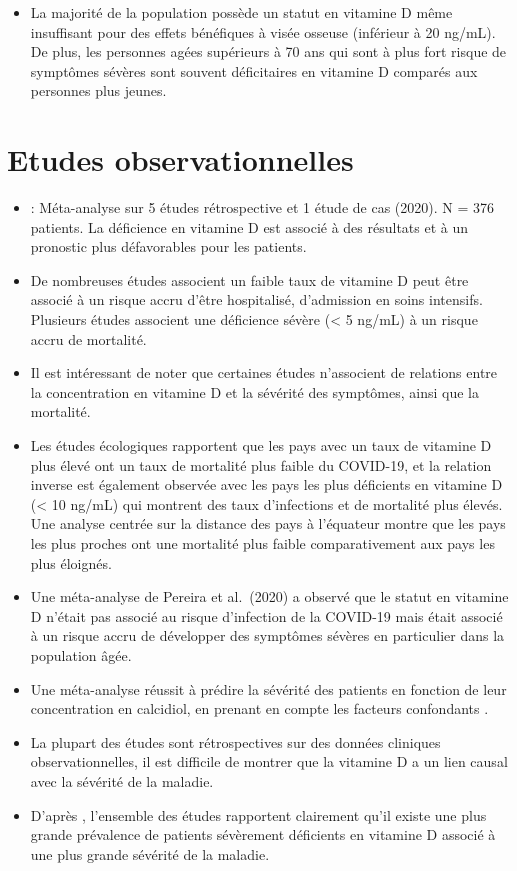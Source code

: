 \documentclass[
  a4paper,
  DIV=11,
  numbers=noendperiod,
  listof=totoc]{scrreprt}
\providecommand{\tightlist}{%
  \setlength{\itemsep}{0pt}\setlength{\parskip}{0pt}}\usepackage{longtable,booktabs,array}
\begin{document}
\begin{itemize}
\tightlist
\item
  La majorité de la population possède un statut en vitamine D même
  insuffisant pour des effets bénéfiques à visée osseuse (inférieur à 20
  ng/mL). De plus, les personnes agées supérieurs à 70 ans qui sont à
  plus fort risque de symptômes sévères sont souvent déficitaires en
  vitamine D comparés aux personnes plus jeunes.
\end{itemize}

\section{Etudes observationnelles}\label{etudes-observationnelles}

\begin{itemize}
\item
  \textcite{Munshi.2021} : Méta-analyse sur 5 études rétrospective et 1
  étude de cas (2020). N = 376 patients. La déficience en vitamine D est
  associé à des résultats et à un pronostic plus défavorables pour les
  patients.
\item
  De nombreuses études associent un faible taux de vitamine D peut être
  associé à un risque accru d'être hospitalisé, d'admission en soins
  intensifs. Plusieurs études associent une déficience sévère
  (\textless{} 5 ng/mL) à un risque accru de mortalité.
\item
  Il est intéressant de noter que certaines études n'associent de
  relations entre la concentration en vitamine D et la sévérité des
  symptômes, ainsi que la mortalité.
\item
  Les études écologiques rapportent que les pays avec un taux de
  vitamine D plus élevé ont un taux de mortalité plus faible du
  COVID-19, et la relation inverse est également observée avec les pays
  les plus déficients en vitamine D (\textless{} 10 ng/mL) qui montrent
  des taux d'infections et de mortalité plus élevés. Une analyse centrée
  sur la distance des pays à l'équateur montre que les pays les plus
  proches ont une mortalité plus faible comparativement aux pays les
  plus éloignés.
\item
  Une méta-analyse de Pereira et al.~(2020) a observé que le statut en
  vitamine D n'était pas associé au risque d'infection de la COVID-19
  mais était associé à un risque accru de développer des symptômes
  sévères en particulier dans la population âgée.
\item
  Une méta-analyse réussit à prédire la sévérité des patients en
  fonction de leur concentration en calcidiol, en prenant en compte les
  facteurs confondants \autocite{Munshi.2021}.
\item
  La plupart des études sont rétrospectives sur des données cliniques
  observationnelles, il est difficile de montrer que la vitamine D a un
  lien causal avec la sévérité de la maladie.
\item
  D'après \textcite{Contreras-Bolívar.2023}, l'ensemble des études
  rapportent clairement qu'il existe une plus grande prévalence de
  patients sévèrement déficients en vitamine D associé à une plus grande
  sévérité de la maladie.
\end{itemize}
\end{document}
